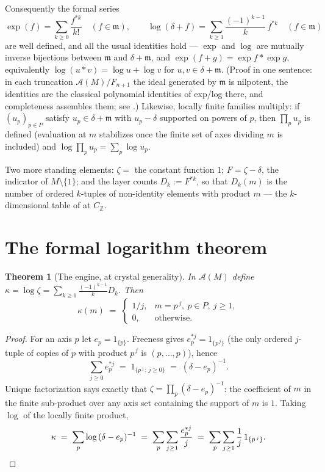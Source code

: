 \documentclass[11pt]{article}
\newtheorem{theorem}{Theorem}
\theoremstyle{remark}
\newcommand{\Z}{\mathbb{Z}}
\newcommand{\m}{\mathfrak{m}}
\newcommand{\A}{\mathcal{A}}
\begin{document}
Consequently the formal series
\[
\exp(f) = \sum_{k \ge 0} \frac{f^{*k}}{k!} \quad (f \in \m), \qquad
\log(\delta + f) = \sum_{k \ge 1} \frac{(-1)^{k-1}}{k}\, f^{*k} \quad (f \in \m)
\]
are well defined, and all the usual identities hold --- $\exp$ and $\log$ are mutually inverse
bijections between $\m$ and $\delta + \m$, and $\exp(f + g) = \exp f * \exp g$, equivalently
$\log(u * v) = \log u + \log v$ for $u, v \in \delta + \m$. (Proof in one sentence: in each
truncation $\A(M)/F_{n+1}$ the ideal generated by $\m$ is nilpotent, the identities are the
classical polynomial identities of exp/log there, and completeness assembles them; see
\cite[Ch.~5]{StanleyEC}.) Likewise, locally finite families multiply: if $(u_p)_{p \in P}$ satisfy
$u_p \in \delta + \m$ with $u_p - \delta$ supported on powers of $p$, then $\prod_p u_p$ is
defined (evaluation at $m$ stabilizes once the finite set of axes dividing $m$ is included) and
$\log \prod_p u_p = \sum_p \log u_p$.

Two more standing elements: $\zeta = $ the constant function $1$; $F = \zeta - \delta$, the
indicator of $M \setminus \{1\}$; and the layer counts $D_k := F^{*k}$, so that $D_k(m)$ is the
number of ordered $k$-tuples of non-identity elements with product $m$ --- the $k$-dimensional
table of \cite{CompanionI} at $C_{\Z}$.

\section{The formal logarithm theorem}

\begin{theorem}[The engine, at crystal generality]\label{thm:engine}
In $\A(M)$ define $\kappa = \log \zeta = \sum_{k \ge 1} \frac{(-1)^{k-1}}{k} D_k$. Then
\[
\kappa(m) \;=\;
\begin{cases}
1/j, & m = p^{\,j},\ p \in P,\ j \ge 1,\\
0, & \text{otherwise.}
\end{cases}
\]
\end{theorem}

\begin{proof}
For an axis $p$ let $e_p = 1_{\{p\}}$. Freeness gives $e_p^{*j} = 1_{\{p^{\,j}\}}$ (the only
ordered $j$-tuple of copies of $p$ with product $p^{\,j}$ is $(p, \dots, p)$), hence
\[
\sum_{j \ge 0} e_p^{*j} \;=\; 1_{\{p^{\,j} \,:\, j \ge 0\}} \;=\; (\delta - e_p)^{-1}.
\]
Unique factorization says exactly that $\zeta = \prod_{p} (\delta - e_p)^{-1}$: the coefficient of
$m$ in the finite sub-product over any axis set containing the support of $m$ is $1$. Taking
$\log$ of the locally finite product,
\[
\kappa \;=\; \sum_p \log\,(\delta - e_p)^{-1} \;=\; \sum_p \sum_{j \ge 1} \frac{e_p^{*j}}{j}
\;=\; \sum_p \sum_{j \ge 1} \frac{1}{j}\, 1_{\{p^{\,j}\}} . \qedhere
\]
\end{proof}
\end{document}
